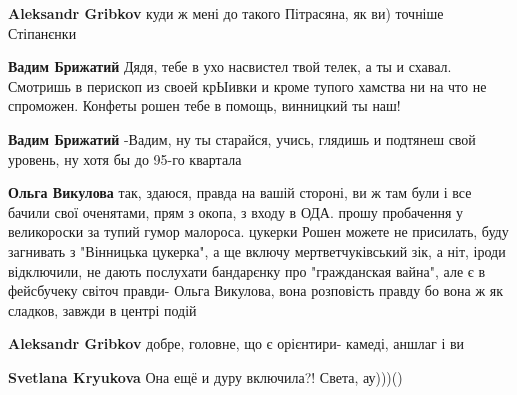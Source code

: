 \begin{itemize}
\begin{itemize}
\textbf{Aleksandr Gribkov} куди ж мені до такого Пітрасяна, як ви) точніше Стіпанєнки

 
\textbf{Вадим Брижатий} Дядя, тебе в ухо насвистел твой телек, а ты и схавал. Смотришь в перископ из своей крЫивки и кроме тупого хамства ни на что не спроможен. Конфеты рошен тебе в помощь, винницкий ты наш!

 
\textbf{Вадим Брижатий} -Вадим, ну ты старайся, учись, глядишь и подтянеш свой уровень, ну хотя бы до 95-го квартала\Laughey[1.0][white]

 
\textbf{Ольга Викулова} так, здаюся, правда на вашій стороні, ви ж там були і все бачили свої оченятами, прям з окопа, з входу в ОДА. прошу пробачення у великороски за тупий гумор малороса. цукерки Рошен можете не присилать, буду загнивать з "Вінницька цукерка", а ще включу мертветчуківський зік, а ніт, іроди відключили, не дають послухати бандарєнку про "гражданская вайна", але є в фейсбучеку світоч правди- Ольга Викулова, вона розповість правду бо вона ж як сладков, завжди в центрі подій

 
\textbf{Aleksandr Gribkov} добре, головне, що є орієнтири- камеді, аншлаг і ви

 
\textbf{Svetlana Kryukova}
Она ещё и дуру включила?! Света, ау)))()


\end{itemize}
\end{itemize}
